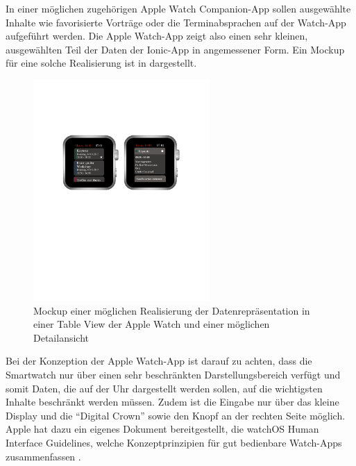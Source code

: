 In einer möglichen zugehörigen Apple Watch Companion-App sollen ausgewählte Inhalte wie favorisierte Vorträge oder die Terminabsprachen auf der Watch-App aufgeführt werden. Die Apple Watch-App zeigt also einen sehr kleinen, ausgewählten Teil der Daten der Ionic-App in angemessener Form. Ein Mockup für eine solche Realisierung ist in  dargestellt. 

\begin{figure}[htb] 
	\centering
	\includegraphics[width=0.6\textwidth]{data/bilder/AppleWatchMockup.pdf}
	\caption{Mockup einer möglichen Realisierung der Datenrepräsentation in einer Table View der Apple Watch und einer möglichen Detailansicht}
	\label{fig:AppleWatchMockup}
\end{figure}

Bei der Konzeption der Apple Watch-App ist darauf zu achten, dass die Smartwatch nur über einen sehr beschränkten Darstellungsbereich verfügt und somit Daten, die auf der Uhr dargestellt werden sollen, auf die wichtigsten Inhalte beschränkt werden müssen. Zudem ist die Eingabe nur über das kleine Display und die \enquote{Digital Crown} sowie den Knopf an der rechten Seite möglich. Apple hat dazu ein eigenes Dokument bereitgestellt, die watchOS Human Interface Guidelines, welche Konzeptprinzipien für gut bedienbare Watch-Apps zusammenfassen \cite{appleWatchInterfaceGuidelines}.

